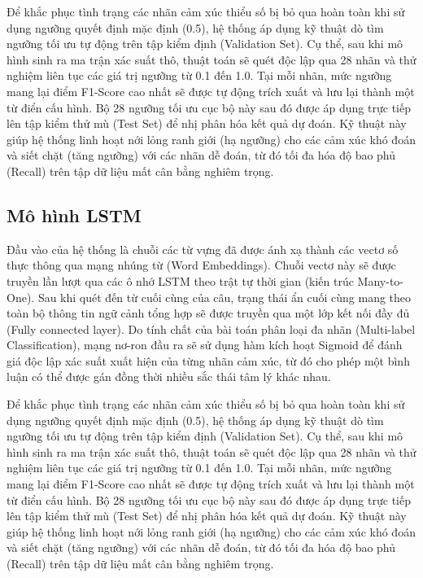 Để khắc phục tình trạng các nhãn cảm xúc thiểu số bị bỏ qua hoàn toàn khi sử dụng ngưỡng quyết định mặc định (0.5), hệ thống áp dụng kỹ thuật dò tìm ngưỡng tối ưu tự động trên tập kiểm định (Validation Set). Cụ thể, sau khi mô hình sinh ra ma trận xác suất thô, thuật toán sẽ quét độc lập qua 28 nhãn và thử nghiệm liên tục các giá trị ngưỡng từ 0.1 đến 1.0. Tại mỗi nhãn, mức ngưỡng mang lại điểm F1-Score cao nhất sẽ được tự động trích xuất và lưu lại thành một từ điển cấu hình. Bộ 28 ngưỡng tối ưu cục bộ này sau đó được áp dụng trực tiếp lên tập kiểm thử mù (Test Set) để nhị phân hóa kết quả dự đoán. Kỹ thuật này giúp hệ thống linh hoạt nới lỏng ranh giới (hạ ngưỡng) cho các cảm xúc khó đoán và siết chặt (tăng ngưỡng) với các nhãn dễ đoán, từ đó tối đa hóa độ bao phủ (Recall) trên tập dữ liệu mất cân bằng nghiêm trọng.

\subsection{Mô hình LSTM}

Đầu vào của hệ thống là chuỗi các từ vựng đã được ánh xạ thành các vectơ số thực thông qua mạng nhúng từ (Word Embeddings). Chuỗi vectơ này sẽ được truyền lần lượt qua các ô nhớ LSTM theo trật tự thời gian (kiến trúc Many-to-One). Sau khi quét đến từ cuối cùng của câu, trạng thái ẩn cuối cùng mang theo toàn bộ thông tin ngữ cảnh tổng hợp sẽ được truyền qua một lớp kết nối đầy đủ (Fully connected layer). Do tính chất của bài toán phân loại đa nhãn (Multi-label Classification), mạng nơ-ron đầu ra sẽ sử dụng hàm kích hoạt Sigmoid để đánh giá độc lập xác suất xuất hiện của từng nhãn cảm xúc, từ đó cho phép một bình luận có thể được gán đồng thời nhiều sắc thái tâm lý khác nhau. 

Để khắc phục tình trạng các nhãn cảm xúc thiểu số bị bỏ qua hoàn toàn khi sử dụng ngưỡng quyết định mặc định (0.5), hệ thống áp dụng kỹ thuật dò tìm ngưỡng tối ưu tự động trên tập kiểm định (Validation Set). Cụ thể, sau khi mô hình sinh ra ma trận xác suất thô, thuật toán sẽ quét độc lập qua 28 nhãn và thử nghiệm liên tục các giá trị ngưỡng từ 0.1 đến 1.0. Tại mỗi nhãn, mức ngưỡng mang lại điểm F1-Score cao nhất sẽ được tự động trích xuất và lưu lại thành một từ điển cấu hình. Bộ 28 ngưỡng tối ưu cục bộ này sau đó được áp dụng trực tiếp lên tập kiểm thử mù (Test Set) để nhị phân hóa kết quả dự đoán. Kỹ thuật này giúp hệ thống linh hoạt nới lỏng ranh giới (hạ ngưỡng) cho các cảm xúc khó đoán và siết chặt (tăng ngưỡng) với các nhãn dễ đoán, từ đó tối đa hóa độ bao phủ (Recall) trên tập dữ liệu mất cân bằng nghiêm trọng.

